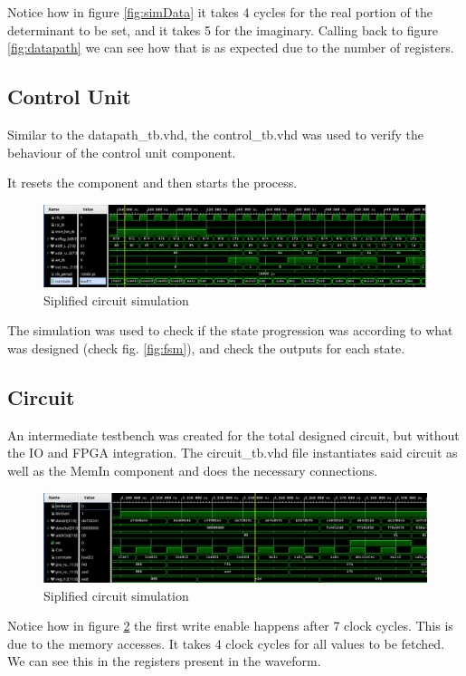 \documentclass[12pt]{article}
\begin{document}
Notice how in figure \ref{fig:simData} it takes 4 cycles for the real portion of the determinant to be set, and it takes 5 for the imaginary. Calling back to figure \ref{fig:datapath} we can see how that is as expected due to the number of registers.

\subsection{Control Unit}
Similar to the datapath\_tb.vhd, the control\_tb.vhd was used to verify the behaviour of the control unit component.

It resets the component and then starts the process. 

\begin{figure}[!htp]
	\centering
	\includegraphics[width=0.7\linewidth]{images/simControl.png}
	\caption{Siplified circuit simulation}
	\label{fig:simContro}
\end{figure}

The simulation was used to check if the state progression was according to what was designed (check fig. \ref{fig:fsm}), and check the outputs for each state.

\subsection{Circuit}
An intermediate testbench was created for the total designed circuit, but without the IO and FPGA integration.
The circuit\_tb.vhd file instantiates said circuit as well as the MemIn component and does the necessary connections.

\begin{figure}[!htp]
	\centering
	\includegraphics[width=0.7\linewidth]{images/simCircuit.png}
	\caption{Siplified circuit simulation}
	\label{fig:simCircuit}
\end{figure}

Notice how in figure \ref{fig:simCircuit} the first write enable happens after 7 clock cycles. This is due to the memory accesses. It takes 4 clock cycles for all values to be fetched. We can see this in the registers present in the waveform.
\end{document}
